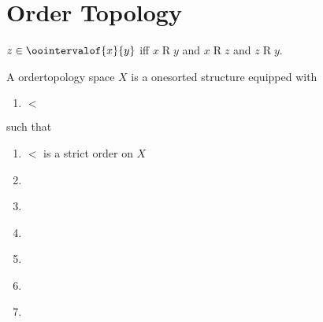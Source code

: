 


\section{Order Topology}

\begin{abbreviation}\label{open_interval}
    $z \in \oointervalof{x}{y}$ iff $x \mathrel{R} y$ and $x \mathrel{R} z$ and $z \mathrel{R} y$.
\end{abbreviation}

\begin{struct}\label{order_topology}
    A ordertopology space $X$ is a onesorted structure equipped with
    \begin{enumerate}
        \item $<$
    \end{enumerate}
    such that 
    \begin{enumerate}
        \item \label{order_topology_1} $<$ is a strict order on $X$
        \item \label{order_topology_2}  
        \item \label{order_topology_3}
        \item \label{order_topology_4}
        \item \label{order_topology}
        \item \label{order_topology}
        \item \label{order_topology}
    \end{enumerate}
\end{struct}



